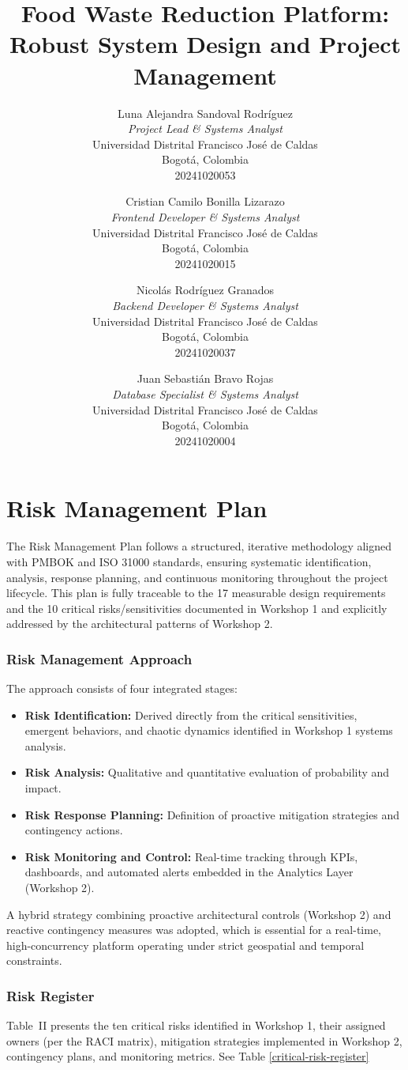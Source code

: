\documentclass[9pt,conference]{IEEEtran}
\title{Food Waste Reduction Platform: Robust System Design and Project Management}
\author{
Luna Alejandra Sandoval Rodríguez \\
\textit{Project Lead \& Systems Analyst} \\
Universidad Distrital Francisco José de Caldas \\
Bogotá, Colombia \\
20241020053
\and
Cristian Camilo Bonilla Lizarazo \\
\textit{Frontend Developer \& Systems Analyst} \\
Universidad Distrital Francisco José de Caldas \\
Bogotá, Colombia \\
20241020015
\and
Nicolás Rodríguez Granados \\
\textit{Backend Developer \& Systems Analyst} \\
Universidad Distrital Francisco José de Caldas \\
Bogotá, Colombia \\
20241020037
\and
Juan Sebastián Bravo Rojas \\
\textit{Database Specialist \& Systems Analyst} \\
Universidad Distrital Francisco José de Caldas \\
Bogotá, Colombia \\
20241020004
}
\begin{document}
\maketitle

\section{Risk Management Plan}

The Risk Management Plan follows a structured, iterative methodology aligned with PMBOK and ISO 31000 standards, ensuring systematic identification, analysis, response planning, and continuous monitoring throughout the project lifecycle. This plan is fully traceable to the 17 measurable design requirements and the 10 critical risks/sensitivities documented in Workshop 1 and explicitly addressed by the architectural patterns of Workshop 2.

\subsubsection{Risk Management Approach}
The approach consists of four integrated stages:
\begin{itemize}
    \item \textbf{Risk Identification:} Derived directly from the critical sensitivities, emergent behaviors, and chaotic dynamics identified in Workshop 1 systems analysis.
    \item \textbf{Risk Analysis:} Qualitative and quantitative evaluation of probability and impact.
    \item \textbf{Risk Response Planning:} Definition of proactive mitigation strategies and contingency actions.
    \item \textbf{Risk Monitoring and Control:} Real-time tracking through KPIs, dashboards, and automated alerts embedded in the Analytics Layer (Workshop 2).
\end{itemize}

A hybrid strategy combining proactive architectural controls (Workshop 2) and reactive contingency measures was adopted, which is essential for a real-time, high-concurrency platform operating under strict geospatial and temporal constraints.

\subsubsection{Risk Register}
Table~II presents the ten critical risks identified in Workshop 1, their assigned owners (per the RACI matrix), mitigation strategies implemented in Workshop 2, contingency plans, and monitoring metrics.
See Table \ref{critical-risk-register}
\end{document}
